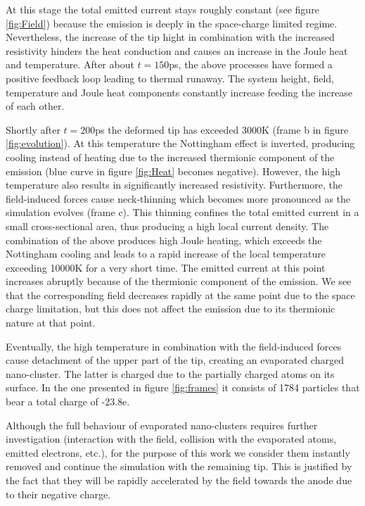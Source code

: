 \documentclass[%
 aps,
 prb,%
 amsmath,amssymb,
reprint,%
superscriptaddress,
]{revtex4-1}
\begin{document}
At this stage the total emitted current stays roughly constant (see figure \ref{fig:Field}) because the emission is deeply in the space-charge limited regime.
Nevertheless, the increase of the tip hight in combination with the increased resistivity hinders the heat conduction and causes an increase in the Joule heat and temperature.
After about $t=150$ps, the above processes have formed a positive feedback loop leading to thermal runaway.
The system height, field, temperature and Joule heat components constantly increase feeding the increase of each other. 

Shortly after $t=200$ps the deformed tip has exceeded 3000K (frame b in figure \ref{fig:evolution}).
At this temperature the Nottingham effect is inverted, producing cooling instead of heating due to the increased thermionic component of the emission (blue curve in figure \ref{fig:Heat} becomes negative).
However, the high temperature also results in significantly increased resistivity.
Furthermore, the field-induced forces cause neck-thinning which becomes more pronounced as the simulation evolves (frame c).
This thinning confines the total emitted current in a small cross-sectional area, thus producing a high local current density. 
The combination of the above produces high Joule heating, which exceeds the Nottingham cooling and leads to a rapid increase of the local temperature exceeding 10000K for a very short time. 
The emitted current at this point increases abruptly because of the thermionic component of the emission.
We see that the corresponding field decreases rapidly at the same point due to the space charge limitation, but this does not affect the emission due to its thermionic nature at that point.

Eventually, the high temperature in combination with the field-induced forces cause detachment of the upper part of the tip, creating an evaporated charged nano-cluster.
The latter is charged due to the partially charged atoms on its surface.
In the one presented in figure \ref{fig:frames} it consists of 1784 particles that bear a total charge of -23.8e. 

Although the full behaviour of evaporated nano-clusters requires further investigation (interaction with the field, collision with the evaporated atoms, emitted electrons, etc.), for the purpose of this work we consider them instantly removed and continue the simulation with the remaining tip. This is justified by the fact that they will be rapidly accelerated by the field towards the anode due to their negative charge.
\end{document}
